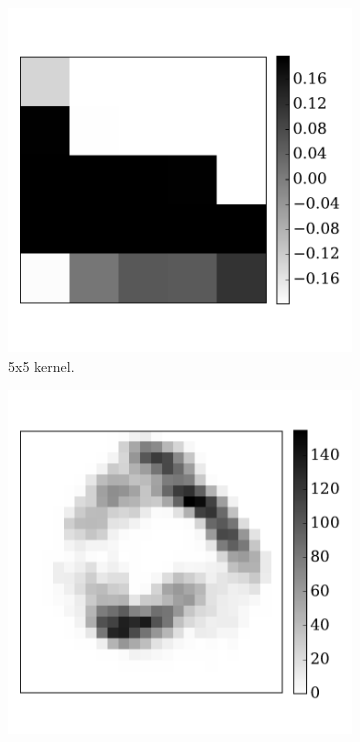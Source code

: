 \begin{figure}[htbp!]
\begin{subfigure}[t]{0.3\textwidth}
			\includegraphics[width=\textwidth]{pics_iconip/6-3.pdf}
			\caption{5x5 kernel.}
			\label{Fig:63}
		\end{subfigure}
		\begin{subfigure}[t]{0.3\textwidth}
			\includegraphics[width=\textwidth]{pics_iconip/6-4.pdf}

\end{subfigure}
\end{figure}
